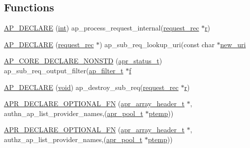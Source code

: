 \subsection*{Functions}
\begin{DoxyCompactItemize}
\item 
\hyperlink{group__APACHE__CORE__REQ_ga69f8d6a39406495ed2d1a88fd5aa9507}{A\+P\+\_\+\+D\+E\+C\+L\+A\+RE} (\hyperlink{pcre_8txt_a42dfa4ff673c82d8efe7144098fbc198}{int}) ap\+\_\+process\+\_\+request\+\_\+internal(\hyperlink{structrequest__rec}{request\+\_\+rec} $\ast$\hyperlink{pcregrep_8txt_a2e9e9438b26c0bb4425367a7e4f75eb3}{r})
\item 
\hyperlink{group__APACHE__CORE__REQ_ga26e83d37eaff2014ed2a9ac7c256481e}{A\+P\+\_\+\+D\+E\+C\+L\+A\+RE} (\hyperlink{structrequest__rec}{request\+\_\+rec} $\ast$) ap\+\_\+sub\+\_\+req\+\_\+lookup\+\_\+uri(const char $\ast$\hyperlink{group__APACHE__CORE__REQ_ga65e3869c33c434213e1bc568332c0df9}{new\+\_\+uri}
\item 
\hyperlink{group__APACHE__CORE__REQ_gae5a03439ae62599367a2e1a5c44012c8}{A\+P\+\_\+\+C\+O\+R\+E\+\_\+\+D\+E\+C\+L\+A\+R\+E\+\_\+\+N\+O\+N\+S\+TD} (\hyperlink{group__apr__errno_gaa5105fa83cc322f09382292db8b47593}{apr\+\_\+status\+\_\+t}) ap\+\_\+sub\+\_\+req\+\_\+output\+\_\+filter(\hyperlink{structap__filter__t}{ap\+\_\+filter\+\_\+t} $\ast$\hyperlink{pcregrep_8txt_a588c778c1c1509e472f22dc36efb005e}{f}
\item 
\hyperlink{group__APACHE__CORE__REQ_gac695d15d3ca75ba6f2f54bbb20f6082b}{A\+P\+\_\+\+D\+E\+C\+L\+A\+RE} (\hyperlink{group__MOD__ISAPI_gacd6cdbf73df3d9eed42fa493d9b621a6}{void}) ap\+\_\+destroy\+\_\+sub\+\_\+req(\hyperlink{structrequest__rec}{request\+\_\+rec} $\ast$\hyperlink{pcregrep_8txt_a2e9e9438b26c0bb4425367a7e4f75eb3}{r})
\item 
\hyperlink{group__APACHE__CORE__REQ_ga3ff8446ce44daaa2ee35bb4800ae5bf6}{A\+P\+R\+\_\+\+D\+E\+C\+L\+A\+R\+E\+\_\+\+O\+P\+T\+I\+O\+N\+A\+L\+\_\+\+FN} (\hyperlink{structapr__array__header__t}{apr\+\_\+array\+\_\+header\+\_\+t} $\ast$, authn\+\_\+ap\+\_\+list\+\_\+provider\+\_\+names,(\hyperlink{structapr__pool__t}{apr\+\_\+pool\+\_\+t} $\ast$\hyperlink{group__APACHE__CORE__CONFIG_ga276c3069e6bb618213a277e21f6f269e}{ptemp}))
\item 
\hyperlink{group__APACHE__CORE__REQ_ga549785834427788e844c79d7525ad4f6}{A\+P\+R\+\_\+\+D\+E\+C\+L\+A\+R\+E\+\_\+\+O\+P\+T\+I\+O\+N\+A\+L\+\_\+\+FN} (\hyperlink{structapr__array__header__t}{apr\+\_\+array\+\_\+header\+\_\+t} $\ast$, authz\+\_\+ap\+\_\+list\+\_\+provider\+\_\+names,(\hyperlink{structapr__pool__t}{apr\+\_\+pool\+\_\+t} $\ast$\hyperlink{group__APACHE__CORE__CONFIG_ga276c3069e6bb618213a277e21f6f269e}{ptemp}))

\end{DoxyCompactItemize}

